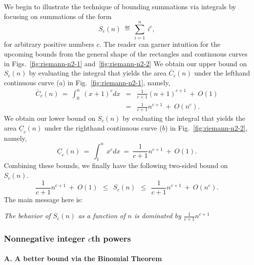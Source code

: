 We begin to illustrate the technique of bounding summations via
integrals by focusing on summations of the form
\[ S_c(n) \ \eqdef \ \sum_{i=1}^n \ i^c, \]
for arbitrary positive numbers $c$.  The reader can garner intuition
for the upcoming bounds from the general shape of the rectangles and
continuous curves in Figs.~\ref{fig:riemann-n2-1}
and~\ref{fig:riemann-n2-2} We obtain our upper bound on $S_c(n)$ by
evaluating the integral that yields the area $\overline{C}_c(n)$ under
the lefthand continuous curve ($a$) in Fig.~\ref{fig:riemann-n2-1},
namely,
\begin{eqnarray}
\label{eq:upper-integral-xc}
\overline{C}_c(n) \ = \
\int_0^n \ (x+1)^c dx & = &
 \frac{1}{c+1} (n+1)^{c+1} \ + \ O(1) \\
\nonumber
 & = & \frac{1}{c+1} n^{c+1} \ + \ O(n^c).
\end{eqnarray}
We obtain our lower bound on $S_c(n)$ by evaluating the integral that
yields the area $\underline{C}_c(n)$ under the righthand continuous
curve ($b$) in Fig.~\ref{fig:riemann-n2-2}, namely,
\begin{equation}
\label{eq:lower-integral-xc}
\underline{C}_c(n) \ = \
\int_1^n \ x^c dx \ = \ \frac{1}{c+1} n^{c+1} \ + \ O(1).
\end{equation}
Combining these bounds, we finally have the following two-sided bound
on $S_c(n)$.
\begin{equation}
\label{eq:bounds-sum-xc}
\frac{1}{c+1} n^{c+1} \ + \ O(1)
  \ \ \leq \ \ S_c(n)
  \ \ \leq \ \ \frac{1}{c+1} n^{c+1} \ + \ O(n^c).
\end{equation}
The main message here is:

{\em The behavior of $S_c(n)$ as a function of $n$ is dominated by
  $\displaystyle \frac{1}{c+1} n^{c+1}$} \\
\hspace*{.2in}{\em as $n$ grows without bound.  }



\subsubsection{Nonnegative integer $c$th powers}
\label{sec:positive-integer-power}

\paragraph{A. A better bound via the Binomial Theorem}

